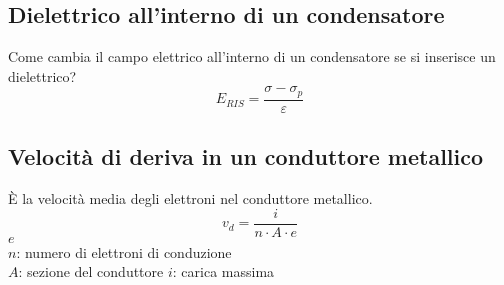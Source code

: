 \subsection{Dielettrico all'interno di un condensatore}
Come cambia il campo elettrico all'interno di un condensatore se si inserisce un dielettrico?
\begin{equation*}
E_{RIS} = \frac{\sigma-\sigma_p}{\varepsilon}
\end{equation*}

\subsection{Velocità di deriva in un conduttore metallico}
È la velocità media degli elettroni nel conduttore metallico.
\begin{equation*}
  v_d = \frac{i}{n\cdot A\cdot e}
\end{equation*}
\hyperref[tab:e-]{$e$}\\
$n$: numero di elettroni di conduzione\\
$A$: sezione del conduttore
$i$: carica massima

